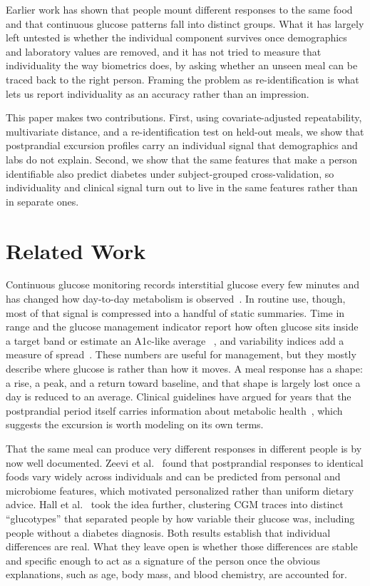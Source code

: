 \documentclass[10pt,conference,compsoc]{IEEEtran}
\begin{document}
Earlier work has shown that people mount different responses to the same food and
that continuous glucose patterns fall into distinct groups. What it has largely
left untested is whether the individual component survives once demographics and
laboratory values are removed, and it has not tried to measure that individuality
the way biometrics does, by asking whether an unseen meal can be traced back to
the right person. Framing the problem as re-identification is what lets us report
individuality as an accuracy rather than an impression.

This paper makes two contributions. First, using covariate-adjusted
repeatability, multivariate distance, and a re-identification test on held-out
meals, we show that postprandial excursion profiles carry an individual signal
that demographics and labs do not explain. Second, we show that the same features
that make a person identifiable also predict diabetes under subject-grouped
cross-validation, so individuality and clinical signal turn out to live in the
same features rather than in separate ones.

\section{Related Work}

Continuous glucose monitoring records interstitial glucose every few minutes and
has changed how day-to-day metabolism is observed~\cite{danne2017}. In routine
use, though, most of that signal is compressed into a handful of static
summaries. Time in range and the glucose management indicator report how often
glucose sits inside a target band or estimate an A1c-like average~%
\cite{battelino2019,bergenstal2018}, and variability indices add a measure of
spread~\cite{monnier2008}. These numbers are useful for management, but they
mostly describe where glucose is rather than how it moves. A meal response has a
shape: a rise, a peak, and a return toward baseline, and that shape is largely
lost once a day is reduced to an average. Clinical guidelines have argued for
years that the postprandial period itself carries information about metabolic
health~\cite{ceriello2008}, which suggests the excursion is worth modeling on its
own terms.

That the same meal can produce very different responses in different people is by
now well documented. Zeevi et al.~\cite{zeevi2015} found that postprandial
responses to identical foods vary widely across individuals and can be predicted
from personal and microbiome features, which motivated personalized rather than
uniform dietary advice. Hall et al.~\cite{hall2018} took the idea further,
clustering CGM traces into distinct ``glucotypes'' that separated people by how
variable their glucose was, including people without a diabetes diagnosis. Both
results establish that individual differences are real. What they leave open is
whether those differences are stable and specific enough to act as a signature of
the person once the obvious explanations, such as age, body mass, and blood
chemistry, are accounted for.
\end{document}
